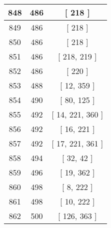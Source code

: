 \begin{center}
\begin{longtable}[H]{|| c c c ||}
\hline
848 & 486 & [ 218 ] \\ 
\hline
849 & 486 & [ 218 ] \\ 
\hline
850 & 486 & [ 218 ] \\ 
\hline
851 & 486 & [ 218, 219 ] \\ 
\hline
852 & 486 & [ 220 ] \\ 
\hline
853 & 488 & [ 12, 359 ] \\ 
\hline
854 & 490 & [ 80, 125 ] \\ 
\hline
855 & 492 & [ 14, 221, 360 ] \\ 
\hline
856 & 492 & [ 16, 221 ] \\ 
\hline
857 & 492 & [ 17, 221, 361 ] \\ 
\hline
858 & 494 & [ 32, 42 ] \\ 
\hline
859 & 496 & [ 19, 362 ] \\ 
\hline
860 & 498 & [ 8, 222 ] \\ 
\hline
861 & 498 & [ 10, 222 ] \\ 
\hline
862 & 500 & [ 126, 363 ] \\ 
\hline
\end{longtable}
\end{center}
